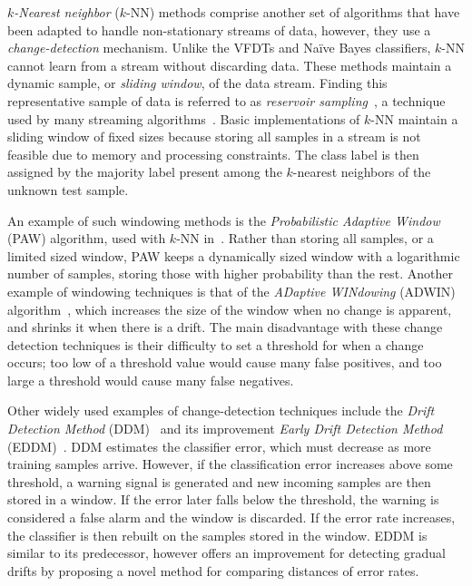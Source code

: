 \documentclass[reqno]{vcuthesis}
\numberwithin{equation}{chapter}
\begin{document}
\textit{$k$-Nearest neighbor} ($k$-NN) methods comprise another set of algorithms that have been adapted to handle non-stationary streams of data, however, they use a \textit{change-detection} mechanism. Unlike the VFDTs and Na\"{i}ve Bayes classifiers, $k$-NN cannot learn from a stream without discarding data. These methods maintain a dynamic sample, or \textit{sliding window}, of the data stream. Finding this representative sample of data is referred to as \textit{reservoir sampling}~\cite{vitter1985random}, a technique used by many streaming algorithms~\cite{ditzler2015learning}. Basic implementations of $k$-NN maintain a sliding window of fixed sizes because storing all samples in a stream is not feasible due to memory and processing constraints. The class label is then assigned by the majority label present among the $k$-nearest neighbors of the unknown test sample. 

An example of such windowing methods is the \textit{Probabilistic Adaptive Window} (PAW) algorithm, used with $k$-NN in~\cite{bifet2013efficient}. Rather than storing all samples, or a limited sized window, PAW keeps a dynamically sized window with a logarithmic number of samples, storing those with higher probability than the rest. Another example of windowing techniques is that of the \textit{ADaptive WINdowing} (ADWIN) algorithm~\cite{bifet2007learning}, which increases the size of the window when no change is apparent, and shrinks it when there is a drift. The main disadvantage with these change detection techniques is their difficulty to set a threshold for when a change occurs; too low of a threshold value would cause many false positives, and too large a threshold would cause many false negatives. 

Other widely used examples of change-detection techniques include the \textit{Drift Detection Method} (DDM)~\cite{gama2004learning} and its improvement \textit{Early Drift Detection Method} (EDDM)~\cite{baena2006early}. DDM estimates the classifier error, which must decrease as more training samples arrive. However, if the classification error increases above some threshold, a warning signal is generated and new incoming samples are then stored in a window. If the error later falls below the threshold, the warning is considered a false alarm and the window is discarded. If the error rate increases, the classifier is then rebuilt on the samples stored in the window. EDDM is similar to its predecessor, however offers an improvement for detecting gradual drifts by proposing a novel method for comparing distances of error rates.
\end{document}
